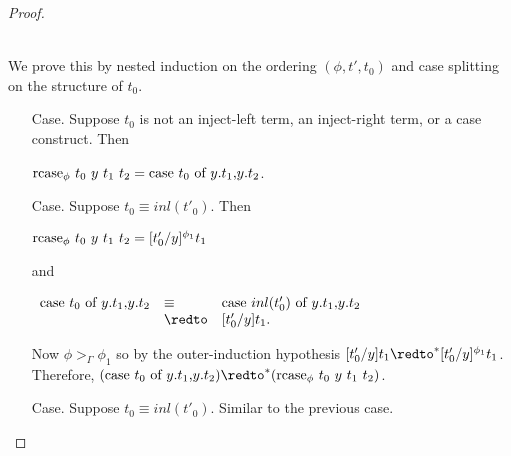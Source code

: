 \begin{proof}
\begin{itemize}
    \ \\
    We prove this by nested induction on the ordering $(\phi,t',t_0)$ and case splitting on
    the structure of $t_0$.  
    \begin{itemize}
    \item[Case.] Suppose $t_0$ is not an inject-left term, an inject-right term, or a case construct.  Then
      \begin{center}
        $\mbox{rcase}_{\phi}\ t_0\ y\ t_1\ t_2 = \mbox{case}\ t_0\ \text{of}\ y\text{.}t_1\text{,}y\text{.}t_2$.
      \end{center}
      
    \item[Case.] Suppose $t_0 \equiv inl(t'_0)$.  Then 
      \begin{center}
        $\mbox{rcase}_{\phi}\ t_0\ y\ t_1\ t_2 = [t'_0/y]^{\phi_1} t_1$
      \end{center}
      and
      \begin{center}
        \begin{math}
          \begin{array}{lll}
            \ccon{t_0}{y}{t_1}{t_2} & \equiv & \ccon{inl(t'_0)}{y}{t_1}{t_2}\\
            & \redto & [t'_0/y]t_1.
          \end{array}
        \end{math}
      \end{center}
      Now $\phi >_{\Gamma} \phi_1$ so by the outer-induction hypothesis 
      $[t'_0/y]t_1 \redto^* [t'_0/y]^{\phi_1} t_1$.  Therefore, 
      $(\ccon{t_0}{y}{t_1}{t_2}) \redto^* (\rcase{\phi}{t_0}{y}{t_1}{t_2})$.
      
    \item[Case.] Suppose $t_0 \equiv inl(t'_0)$.  Similar to the previous case.
      

\end{itemize}
\end{itemize}
\end{proof}
